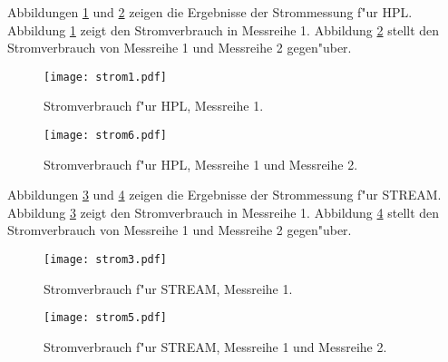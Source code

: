 Abbildungen \ref{fig:strom1} und \ref{fig:strom6} zeigen die Ergebnisse der Strommessung f"ur HPL. Abbildung \ref{fig:strom1} zeigt den Stromverbrauch in Messreihe 1. Abbildung \ref{fig:strom6} stellt den Stromverbrauch von Messreihe 1 und Messreihe 2 gegen"uber. 
\begin{figure}[htb]
  \centering
  \texttt{[image: strom1.pdf]}\\ 
  \caption{Stromverbrauch f"ur HPL, Messreihe 1.}\label{fig:strom1}
\end{figure}
\begin{figure}[H]
  \centering
  \texttt{[image: strom6.pdf]}\\ 
  \caption{Stromverbrauch f"ur HPL, Messreihe 1 und Messreihe 2.}\label{fig:strom6}
\end{figure}
\newpage
\noindent
Abbildungen \ref{fig:strom3} und \ref{fig:strom5} zeigen die Ergebnisse der Strommessung f"ur STREAM. Abbildung \ref{fig:strom3} zeigt den Stromverbrauch in Messreihe 1. Abbildung \ref{fig:strom5} stellt den Stromverbrauch von Messreihe 1 und Messreihe 2 gegen"uber.
\begin{figure}[htb]
  \centering
  \texttt{[image: strom3.pdf]}\\ 
  \caption{Stromverbrauch f"ur STREAM, Messreihe 1.}\label{fig:strom3}
\end{figure}
\begin{figure}[H]
  \centering
  \texttt{[image: strom5.pdf]}\\ 
  \caption{Stromverbrauch f"ur STREAM, Messreihe 1 und Messreihe 2.}\label{fig:strom5}
\end{figure}
\endinput 


